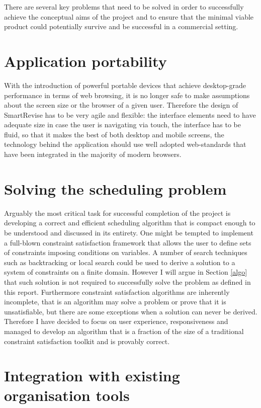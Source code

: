\documentclass[bsc,frontabs,twoside,singlespacing,parskip]{infthesis}     %
\begin{document}
		There are several key problems that need to be solved in order to successfully achieve the conceptual aims of the project and to ensure that the minimal viable product could potentially survive and be successful in a commercial setting.
	
	\section{Application portability}
	
		With the introduction of powerful portable devices that achieve desktop-grade performance in terms of web browsing, it is no longer safe to make assumptions about the screen size or the browser of a given user. Therefore the design of SmartRevise has to be very agile and flexible: the interface elements need to have adequate size in case the user is navigating via touch, the interface has to be fluid, so that it makes the best of both desktop and mobile screens, the technology behind the application should use well adopted web-standards that have been integrated in the majority of modern browsers.
		
	\section{Solving the scheduling problem}
	
		Arguably the most critical task for successful completion of the project is developing a correct and efficient scheduling algorithm that is compact enough to be understood and discussed in its entirety. One might be tempted to implement a full-blown constraint satisfaction framework that allows the user to define sets of constraints imposing conditions on variables. A number of search techniques such as backtracking or local search could be used to derive a solution to a system of constraints on a finite domain. However I will argue in Section \ref{algo} that such solution is not required to successfully solve the problem as defined in this report. Furthermore constraint satisfaction algorithms are inherently incomplete, that is an algorithm may solve a problem or prove that it is unsatisfiable, but there are some exceptions when a solution can never be derived. Therefore I have decided to focus on user experience, responsiveness and managed to develop an algorithm that is a fraction of the size of a traditional constraint satisfaction toolkit and is provably correct.
	
	\section{Integration with existing organisation tools}
	
\end{document}
